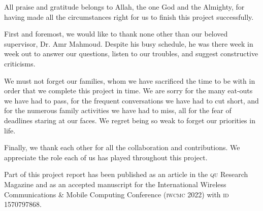 \documentclass[../main.tex]{subfiles}
\begin{document}

All praise and gratitude belongs to Allah, the one God 
and the Almighty, for having made all the circumstances 
right for us to finish this project successfully.

First and foremost, we would like to thank none other than
our beloved supervisor, Dr. Amr Mahmoud. Despite his busy
schedule, he was there
week in week out to answer our questions, listen to our
troubles, and suggest constructive criticisms. 

We must not forget our families, whom we have sacrificed 
the time to be with in order that we complete this project
in time. We are
sorry for the many eat-outs we have had to pass, 
for the frequent conversations we have had to cut short,
and for the numerous family activities we have had to miss,
all for the fear of deadlines staring at our faces.
We regret being so weak to forget our priorities in life.

Finally, we thank each other for all the collaboration
and contributions. We appreciate the role each of us
has played throughout this project.

Part of this project report has been published as an article in the
\textsc{qu} Research Magazine and as an accepted manuscript for the
International Wireless Communications \& Mobile Computing Conference
(\textsc{iwcmc} 2022) with \textsc{id} 1570797868.
\end{document}
